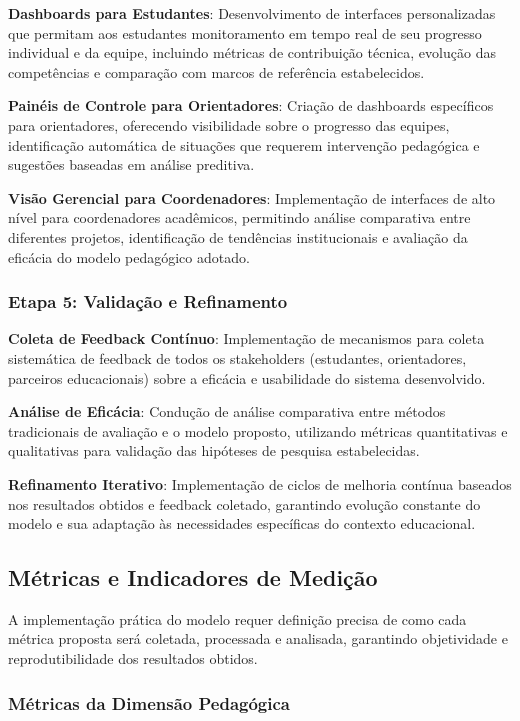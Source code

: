 \documentclass[12pt, a4paper, oneside]{abntex2}
\begin{document}
\textbf{Dashboards para Estudantes}: Desenvolvimento de interfaces personalizadas que permitam aos estudantes monitoramento em tempo real de seu progresso individual e da equipe, incluindo métricas de contribuição técnica, evolução das competências e comparação com marcos de referência estabelecidos.

\textbf{Painéis de Controle para Orientadores}: Criação de dashboards específicos para orientadores, oferecendo visibilidade sobre o progresso das equipes, identificação automática de situações que requerem intervenção pedagógica e sugestões baseadas em análise preditiva.

\textbf{Visão Gerencial para Coordenadores}: Implementação de interfaces de alto nível para coordenadores acadêmicos, permitindo análise comparativa entre diferentes projetos, identificação de tendências institucionais e avaliação da eficácia do modelo pedagógico adotado.

\subsubsection{Etapa 5: Validação e Refinamento}

\textbf{Coleta de Feedback Contínuo}: Implementação de mecanismos para coleta sistemática de feedback de todos os stakeholders (estudantes, orientadores, parceiros educacionais) sobre a eficácia e usabilidade do sistema desenvolvido.

\textbf{Análise de Eficácia}: Condução de análise comparativa entre métodos tradicionais de avaliação e o modelo proposto, utilizando métricas quantitativas e qualitativas para validação das hipóteses de pesquisa estabelecidas.

\textbf{Refinamento Iterativo}: Implementação de ciclos de melhoria contínua baseados nos resultados obtidos e feedback coletado, garantindo evolução constante do modelo e sua adaptação às necessidades específicas do contexto educacional.

\subsection{Métricas e Indicadores de Medição}

A implementação prática do modelo requer definição precisa de como cada métrica proposta será coletada, processada e analisada, garantindo objetividade e reprodutibilidade dos resultados obtidos.

\subsubsection{Métricas da Dimensão Pedagógica}
\end{document}
